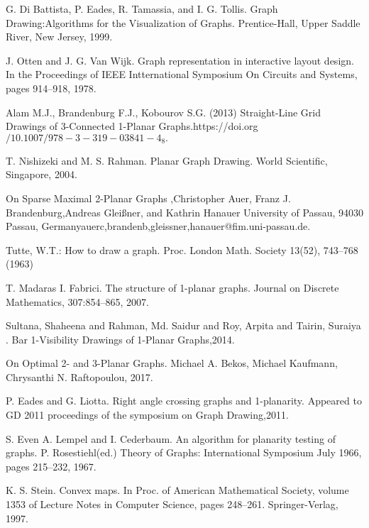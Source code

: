 \begin{thebibliography}{9}
G. Di Battista, P. Eades, R. Tamassia, and I. G. Tollis. Graph Drawing:Algorithms for the Visualization of Graphs. Prentice-Hall, Upper Saddle River, New Jersey, 1999.



J. Otten and J. G. Van Wijk. Graph representation in interactive layout design. In the Proceedings of IEEE Intternational Symposium On Circuits and Systems, pages 914–918, 1978.





Alam M.J., Brandenburg F.J., Kobourov S.G. (2013) Straight-Line Grid Drawings of 3-Connected 1-Planar Graphs.https://doi.org$/10.1007/978-3-319-03841-4_8.$




T. Nishizeki and M. S. Rahman. Planar Graph Drawing. World Scientific, Singapore, 2004.




On Sparse Maximal 2-Planar Graphs ,Christopher Auer, Franz J. Brandenburg,Andreas Gleißner, and Kathrin Hanauer University of Passau, 94030 Passau, Germany{auerc,brandenb,gleissner,hanauer}@fim.uni-passau.de.



{Tutte, W.T.: How to draw a graph. Proc. London Math. Society 13(52), 743–768 (1963)}




T. Madaras I. Fabrici. The structure of 1-planar graphs. Journal on Discrete Mathematics, 307:854–865, 2007.



Sultana, Shaheena and Rahman, Md. Saidur and Roy, Arpita and Tairin, Suraiya . Bar 1-Visibility Drawings of 1-Planar Graphs,2014.


On Optimal 2- and 3-Planar Graphs. Michael A. Bekos, Michael Kaufmann, Chrysanthi N. Raftopoulou, 2017.


P. Eades and G. Liotta. Right angle crossing graphs and 1-planarity. Appeared to GD 2011 proceedings of the symposium on Graph Drawing,2011.



S. Even A. Lempel and I. Cederbaum. An algorithm for planarity testing of graphs. P. Rosestiehl(ed.) Theory of Graphs: International Symposium July 1966, pages 215–232, 1967.


K. S. Stein. Convex maps. In Proc. of American Mathematical Society, volume 1353 of Lecture Notes in Computer Science, pages 248–261. Springer-Verlag, 1997.




\end{thebibliography}
